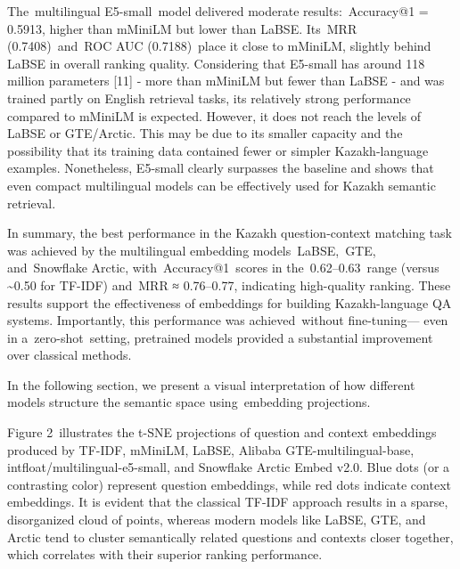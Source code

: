 \begin{multicols}{2}
The~multilingual E5-small~model delivered moderate results:~Accuracy@1 =
0.5913, higher than mMiniLM but lower than LaBSE. Its~MRR
(0.7408)~and~ROC AUC (0.7188)~place it close to mMiniLM, slightly behind
LaBSE in overall ranking quality. Considering that E5-small has around
118 million parameters {[}11{]} - more than mMiniLM but fewer than LaBSE
- and was trained partly on English retrieval tasks, its relatively
strong performance compared to mMiniLM is expected. However, it does not
reach the levels of LaBSE or GTE/Arctic. This may be due to its smaller
capacity and the possibility that its training data contained fewer or
simpler Kazakh-language examples. Nonetheless, E5-small clearly
surpasses the baseline and shows that even compact multilingual models
can be effectively used for Kazakh semantic retrieval.

In summary, the best performance in the Kazakh question-context matching
task was achieved by the multilingual embedding models~LaBSE,~GTE,
and~Snowflake Arctic, with~Accuracy@1~scores in the~0.62--0.63~range
(versus \textasciitilde0.50 for TF-IDF) and~MRR ≈ 0.76--0.77, indicating
high-quality ranking. These results support the effectiveness of
embeddings for building Kazakh-language QA systems. Importantly, this
performance was achieved~without fine-tuning--- even in
a~zero-shot~setting, pretrained models provided a substantial
improvement over classical methods.

In the following section, we present a visual interpretation of how
different models structure the semantic space using~embedding
projections.

Figure 2~illustrates the t-SNE projections of question and context
embeddings produced by TF-IDF, mMiniLM, LaBSE, Alibaba
GTE-multilingual-base, intfloat/multilingual-e5-small, and Snowflake
Arctic Embed v2.0. Blue dots (or a contrasting color) represent question
embeddings, while red dots indicate context embeddings. It is evident
that the classical TF-IDF approach results in a sparse, disorganized
cloud of points, whereas modern models like LaBSE, GTE, and Arctic tend
to cluster semantically related questions and contexts closer together,
which correlates with their superior ranking performance.
\end{multicols}



